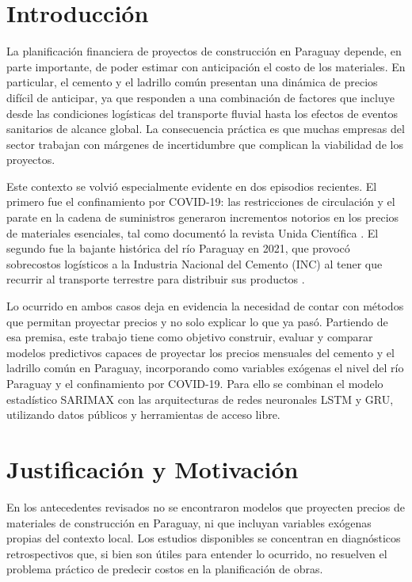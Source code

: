 \vspace{0.5cm}
\section{Introducción}
\justify
La planificación financiera de proyectos de construcción en Paraguay depende, en parte importante, de poder estimar con anticipación el costo de los materiales. En particular, el cemento y el ladrillo común presentan una dinámica de precios difícil de anticipar, ya que responden a una combinación de factores que incluye desde las condiciones logísticas del transporte fluvial hasta los efectos de eventos sanitarios de alcance global. La consecuencia práctica es que muchas empresas del sector trabajan con márgenes de incertidumbre que complican la viabilidad de los proyectos.

\justify
Este contexto se volvió especialmente evidente en dos episodios recientes. El primero fue el confinamiento por COVID-19: las restricciones de circulación y el parate en la cadena de suministros generaron incrementos notorios en los precios de materiales esenciales, tal como documentó la revista Unida Científica \cite{almada2022}. El segundo fue la bajante histórica del río Paraguay en 2021, que provocó sobrecostos logísticos a la Industria Nacional del Cemento (INC) al tener que recurrir al transporte terrestre para distribuir sus productos \cite{lanacion_inc_bajante_2021}.

\justify
Lo ocurrido en ambos casos deja en evidencia la necesidad de contar con métodos que permitan proyectar precios y no solo explicar lo que ya pasó. Partiendo de esa premisa, este trabajo tiene como objetivo construir, evaluar y comparar modelos predictivos \cite{Sosa-Cabrera2024} capaces de proyectar los precios mensuales del cemento y el ladrillo común en Paraguay, incorporando como variables exógenas el nivel del río Paraguay y el confinamiento por COVID-19. Para ello se combinan el modelo estadístico SARIMAX con las arquitecturas de redes neuronales LSTM y GRU, utilizando datos públicos y herramientas de acceso libre.

\section{Justificación y Motivación}
\justify
En los antecedentes revisados no se encontraron modelos que proyecten precios de materiales de construcción en Paraguay, ni que incluyan variables exógenas propias del contexto local. Los estudios disponibles se concentran en diagnósticos retrospectivos que, si bien son útiles para entender lo ocurrido, no resuelven el problema práctico de predecir costos en la planificación de obras.


